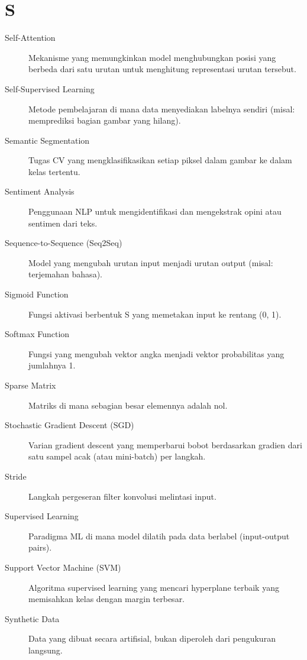 \section*{S}
\begin{description}
    \item[Self-Attention] Mekanisme yang memungkinkan model menghubungkan posisi yang berbeda dari satu urutan untuk menghitung representasi urutan tersebut.
    \item[Self-Supervised Learning] Metode pembelajaran di mana data menyediakan labelnya sendiri (misal: memprediksi bagian gambar yang hilang).
    \item[Semantic Segmentation] Tugas CV yang mengklasifikasikan setiap piksel dalam gambar ke dalam kelas tertentu.
    \item[Sentiment Analysis] Penggunaan NLP untuk mengidentifikasi dan mengekstrak opini atau sentimen dari teks.
    \item[Sequence-to-Sequence (Seq2Seq)] Model yang mengubah urutan input menjadi urutan output (misal: terjemahan bahasa).
    \item[Sigmoid Function] Fungsi aktivasi berbentuk S yang memetakan input ke rentang (0, 1).
    \item[Softmax Function] Fungsi yang mengubah vektor angka menjadi vektor probabilitas yang jumlahnya 1.
    \item[Sparse Matrix] Matriks di mana sebagian besar elemennya adalah nol.
    \item[Stochastic Gradient Descent (SGD)] Varian gradient descent yang memperbarui bobot berdasarkan gradien dari satu sampel acak (atau mini-batch) per langkah.
    \item[Stride] Langkah pergeseran filter konvolusi melintasi input.
    \item[Supervised Learning] Paradigma ML di mana model dilatih pada data berlabel (input-output pairs).
    \item[Support Vector Machine (SVM)] Algoritma supervised learning yang mencari hyperplane terbaik yang memisahkan kelas dengan margin terbesar.
    \item[Synthetic Data] Data yang dibuat secara artifisial, bukan diperoleh dari pengukuran langsung.
\end{description}

